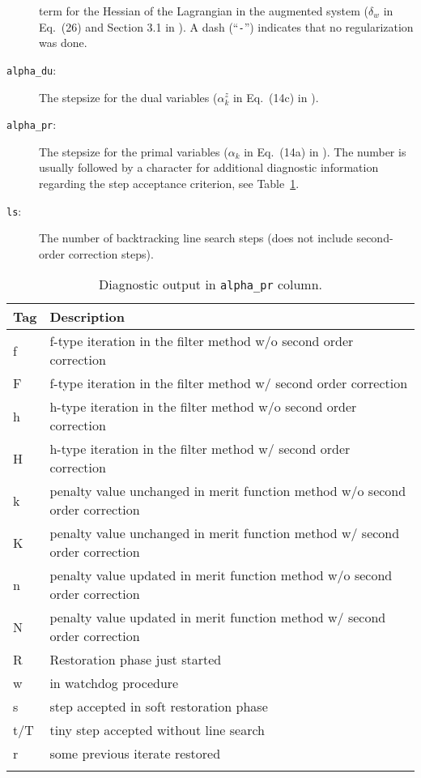 \documentclass[10pt]{article}
\begin{document}
\begin{description}
  term for the Hessian of the Lagrangian in the augmented system
  ($\delta_w$ in Eq.~(26) and Section 3.1 in \cite{WaecBieg06:mp}).  A
  dash (``\texttt{-}'') indicates that no regularization was done.
\item[{\tt alpha\_du}:] The stepsize for the dual variables
  ($\alpha^z_k$ in Eq.~(14c) in \cite{WaecBieg06:mp}).
\item[{\tt alpha\_pr}:] The stepsize for the primal
  variables ($\alpha_k$ in Eq.~(14a) in \cite{WaecBieg06:mp}).  The
  number is usually followed by a character for additional diagnostic
  information regarding the step acceptance criterion, see
  Table~\ref{tab:alpha_pr}.
\item[{\tt ls}:] The number of backtracking line search steps (does
  not include second-order correction steps).
\end{description}

\begin{table}
  \centering
  \begin{tabular}{ll}
    Tag & Description \\
    \hline
    f & f-type iteration in the filter method w/o second order correction \\
    F & f-type iteration in the filter method w/ second order correction \\
    h & h-type iteration in the filter method w/o second order correction \\
    H & h-type iteration in the filter method w/ second order correction \\
    k & penalty value unchanged in merit function method w/o second order correction \\
    K & penalty value unchanged in merit function method w/ second order correction \\
    n & penalty value updated in merit function method w/o second order correction \\
    N & penalty value updated in merit function method w/ second order correction \\
    R & Restoration phase just started \\
    w &  in watchdog procedure \\
    s & step accepted in soft restoration phase \\
    t/T & tiny step accepted without line search \\
    r & some previous iterate restored \\
    \hline \\
  \end{tabular} 

  \caption{Diagnostic output in {\tt alpha\_pr} column.}
  \label{tab:alpha_pr}
\end{table}
\end{document}
